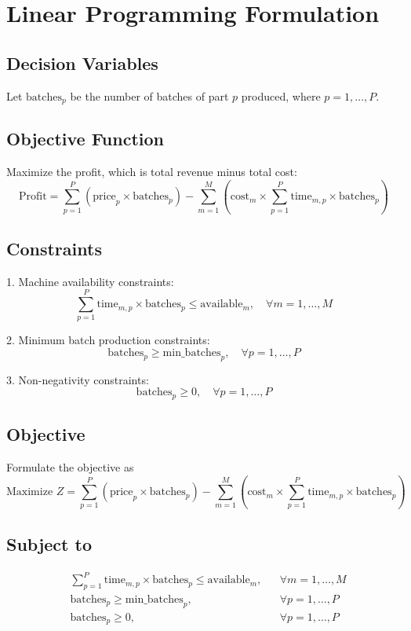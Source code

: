 \documentclass{article}
\begin{document}
\section*{Linear Programming Formulation}

\subsection*{Decision Variables}
Let \( \text{batches}_p \) be the number of batches of part \( p \) produced, where \( p = 1, \ldots, P \).

\subsection*{Objective Function}
Maximize the profit, which is total revenue minus total cost:
\[
\text{Profit} = \sum_{p=1}^{P} \left( \text{price}_p \times \text{batches}_p \right) - \sum_{m=1}^{M} \left( \text{cost}_m \times \sum_{p=1}^{P} \text{time}_{m,p} \times \text{batches}_p \right)
\]

\subsection*{Constraints}

1. Machine availability constraints:
   \[
   \sum_{p=1}^{P} \text{time}_{m,p} \times \text{batches}_p \leq \text{available}_m, \quad \forall m = 1, \ldots, M
   \]

2. Minimum batch production constraints:
   \[
   \text{batches}_p \geq \text{min\_batches}_p, \quad \forall p = 1, \ldots, P
   \]

3. Non-negativity constraints:
   \[
   \text{batches}_p \geq 0, \quad \forall p = 1, \ldots, P
   \]

\subsection*{Objective}
Formulate the objective as
\[
\text{Maximize } Z = \sum_{p=1}^{P} \left( \text{price}_p \times \text{batches}_p \right) - \sum_{m=1}^{M} \left( \text{cost}_m \times \sum_{p=1}^{P} \text{time}_{m,p} \times \text{batches}_p \right)
\]

\subsection*{Subject to}
\[
\begin{align*}
& \sum_{p=1}^{P} \text{time}_{m,p} \times \text{batches}_p \leq \text{available}_m, && \forall m = 1, \ldots, M \\
& \text{batches}_p \geq \text{min\_batches}_p, && \forall p = 1, \ldots, P \\
& \text{batches}_p \geq 0, && \forall p = 1, \ldots, P
\end{align*}
\]
\end{document}
